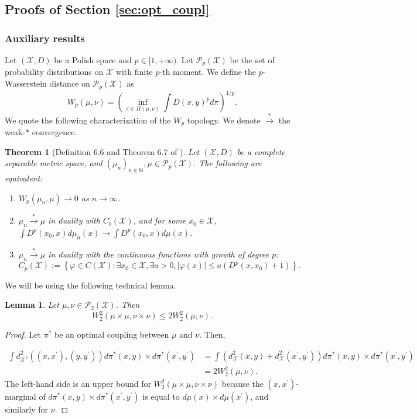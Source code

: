 \documentclass{article}
\newcommand{\X}{\mathcal{X}}
\newcommand{\1}{\mathbf{1}}
\renewcommand{\P}{\mathcal{P}}
\newtheorem{theorem}{Theorem}
\newtheorem{lemma}{Lemma}
\theoremstyle{definition}
\theoremstyle{remark}
\begin{document}
\begin{appendices}
\subsection{Proofs of Section \ref{sec:opt_coupl}}
\subsubsection*{Auxiliary results}

Let $(\X,D)$ be a Polish space and $p\in [1,+\infty)$. Let $\P_p(\X)$ be the set of probability distributions on $\X$ with finite $p$-th moment. We define the $p$-Wasserstein distance on $\P_p(\X)$ as 
\[W_{p}(\mu,\nu)=\left(\inf_{\pi\in\Pi(\mu,\nu)}\int D(x,y)^p d\pi\right)^{1/p}.\]
We quote the following characterization of the $W_{p}$ topology. We denote $\overset{*}{\to}$ the weak-$*$ convergence. 


\begin{theorem}[Definition 6.6 and Theorem 6.7 of \cite{villani2008optimal}]
\label{thm:W2-topology}
Let $(\X,D)$ be a complete separable metric space, and $(\mu_{n})_{n\in\mathbb{N}},\mu\in \mathcal{P}_{p}(\X)$. The following are equivalent:
\begin{enumerate}
\item $W_{p}(\mu_{n},\mu)\rightarrow0$ as $n\rightarrow\infty$.
\item $\mu_{n}\overset{*}{\to}\mu$ in duality with $C_{b}(\X)$,
and for some $x_{0}\in \X$, $\int D^{p}(x_{0},x)d\mu_{n}(x)\rightarrow\int D^{p}(x_{0},x)d\mu(x)$.
\item $\mu_{n}\overset{*}{\to}\mu$ in duality with 
the continuous functions with growth of degree $p$: \[C_{p}(\X):=\left\{ \varphi\in C(\X):\exists x_{0}\in \X,\exists a>0,|\varphi(x)|\leq a(D^{p}(x,x_{0})+1)\right\}.\]

\end{enumerate}
\end{theorem}


We will be using the following technical lemma.
\begin{lemma}
\label{lem:w2-product-bound}
Let $\mu,\nu\in\mathcal{P}_{2}(\X)$. Then 
\[
W_{2}^{2}(\mu\times\mu,\nu\times\nu)\leq2W_{2}^{2}(\mu,\nu).
\]
\end{lemma}

\begin{proof}
Let $\pi^{*}$ be an optimal coupling between $\mu$ and $\nu$. Then,

\begin{align*}
\int d_{\mathcal{X}^{2}}^{2}\left((x,x^{\prime}),(y,y^{\prime})\right)d\pi^{*}(x,y)\times d\pi^{*}(x^{\prime},y^{\prime}) & =\int\left(d_{\mathcal{X}}^{2}(x,y)+d_{\mathcal{X}}^{2}(x^{\prime},y^{\prime})\right)d\pi^{*}(x,y)\times d\pi^{*}(x^{\prime},y^{\prime})\\
 & =2W_{2}^{2}(\mu,\nu).
\end{align*}
The left-hand side is an upper bound for $W_{2}^{2}(\mu\times\mu,\nu\times\nu)$
because the $(x,x^{\prime})$-marginal of $d\pi^{*}(x,y)\times d\pi^{*}(x^{\prime},y^{\prime})$
is equal to $d\mu(x)\times d\mu(x^{\prime})$, and similarly for
$\nu$. 
\end{proof}



\end{appendices}
\end{document}
